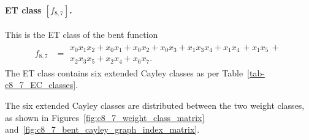 \paragraph*{ET class $[f_{8,7}]$.}
%
This is the ET class of the bent function
\small{}
\begin{align*}
f_{ 8 , 7 } &=
\begin{array}{l}
x_{0} x_{1} x_{2} + x_{0} x_{1} + x_{0} x_{2} + x_{0} x_{3} + x_{1} x_{3} x_{4} + x_{1} x_{4}\, +
x_{1} x_{5}\, +
\\
x_{2} x_{3} x_{5} + x_{2} x_{4} + x_{6} x_{7}.
\end{array}
\end{align*}
\normalsize{}
The ET class contains six extended Cayley classes as per Table~\ref{tab-c8_7_EC_classes}.

The six extended Cayley classes are distributed between the two weight classes,
as shown in Figures~\ref{fig:c8_7_weight_class_matrix} and~\ref{fig:c8_7_bent_cayley_graph_index_matrix}.

